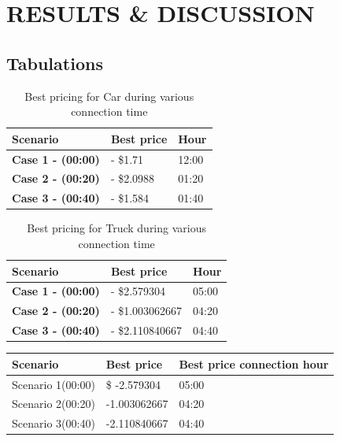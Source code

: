 
	\chapter{RESULTS \& DISCUSSION}
	\label{chap:results}
	
	\section{Tabulations}
		\begin{table}[h]
			\centering
			\begin{tabular}{|l|l|l|}
				\hline
				\textbf{Scenario}         & \textbf{Best price} & \textbf{Hour} \\ \hline
				\textbf{Case 1 - (00:00)} & - \$1.71            & 12:00         \\ \hline
				\textbf{Case 2 - (00:20)} & - \$2.0988          & 01:20         \\ \hline
				\textbf{Case 3 - (00:40)} & - \$1.584           & 01:40         \\ \hline
			\end{tabular}
			\caption{Best pricing for Car during various connection time}
		\end{table}
	
		\begin{table}[h]
			\centering
			\begin{tabular}{|l|l|l|}
				\hline
				\textbf{Scenario}         & \textbf{Best price} & \textbf{Hour} \\ \hline
				\textbf{Case 1 - (00:00)}  & - \$2.579304 & 05:00         \\ \hline
				\textbf{Case 2 - (00:20)} & - \$1.003062667 & 04:20         \\ \hline
				\textbf{Case 3 - (00:40)} & - \$2.110840667 & 04:40         \\ \hline
			\end{tabular}
			\caption{Best pricing for Truck during various connection time}
		\end{table}




		\begin{tabular}{|l|l|l|}
			\hline
			Scenario          & Best price   & Best price connection hour \\ \hline
			Scenario 1(00:00) & \$ -2.579304 & 05:00                      \\ \hline
			Scenario 2(00:20) & -1.003062667 & 04:20                      \\ \hline
			Scenario 3(00:40) & -2.110840667 & 04:40                      \\ \hline
		\end{tabular}
		
